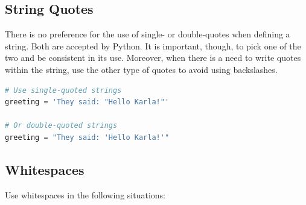 \documentclass{tufte-handout}
\begin{document}
\subsection{String Quotes}
There is no preference for the use of single- or double-quotes when defining a string.
Both are accepted by Python.
It is important, though, to pick one of the two and be consistent in its use.
Moreover, when there is a need to write quotes within the string, use the other type of quotes to avoid using backslashes.

\begin{lstlisting}[numbers=none,language=python]
# Use single-quoted strings
greeting = 'They said: "Hello Karla!"'

# Or double-quoted strings
greeting = "They said: 'Hello Karla!'"

\end{lstlisting}


\subsection{Whitespaces}

Use whitespaces in the following situations:
\end{document}
